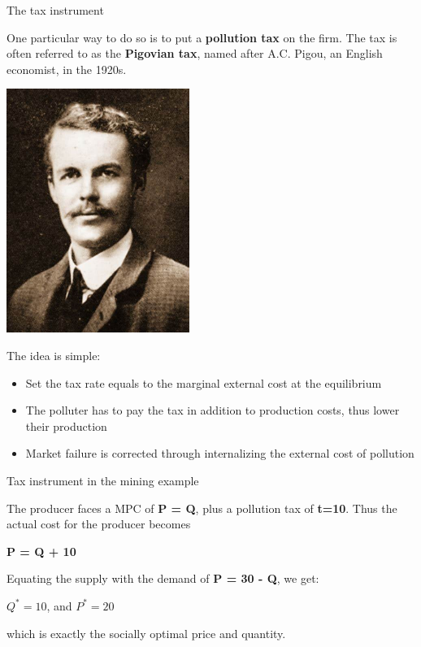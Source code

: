 \begin{frame}{The tax instrument}
\protect\hypertarget{the-tax-instrument}{}

One particular way to do so is to put a \textbf{pollution tax} on the
firm. The tax is often referred to as the \textbf{Pigovian tax}, named
after A.C. Pigou, an English economist, in the 1920s.

\includegraphics[width=\textwidth,height=3.125in]{figures/m4_pigou.jpeg}

\end{frame}

\begin{frame}{}
\protect\hypertarget{section-6}{}

The idea is simple:

\begin{itemize}
\tightlist
\item
  Set the tax rate equals to the marginal external cost at the
  equilibrium
\item
  The polluter has to pay the tax in addition to production costs, thus
  lower their production
\item
  Market failure is corrected through internalizing the external cost of
  pollution
\end{itemize}

\end{frame}

\begin{frame}{Tax instrument in the mining example}
\protect\hypertarget{tax-instrument-in-the-mining-example}{}

The producer faces a MPC of \textbf{P = Q}, plus a pollution tax of
\textbf{t=10}. Thus the actual cost for the producer becomes

\textbf{P = Q + 10}

Equating the supply with the demand of \textbf{P = 30 - Q}, we get:

\(Q^* = 10\), and \(P^* = 20\)

which is exactly the socially optimal price and quantity.

\end{frame}


